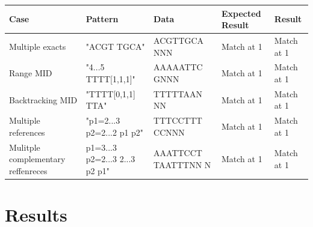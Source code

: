 \documentclass[12pt]{article}
\newcommand{\textapprox}{\raisebox{0.5ex}{\texttildelow}}
\begin{document}
 \begin{table}[h]
\begin{tabular}{p{4cm}|p{3cm}|p{2.5cm}|p{2.5cm}|p{2.5cm}}
Case 			& Pattern & Data & Expected Result & Result \\ \hline
Multiple exacts 	& "ACGT TGCA" & ACGTTGCA NNN & Match at 1 & Match at 1\\ \hline
Range MID		& "4...5 TTTT[1,1,1]" & AAAAATTC GNNN & Match at 1 & Match at 1\\ \hline
Backtracking MID & "TTTT[0,1,1] TTA" & TTTTTAAN NN & Match at 1 & Match at 1\\ \hline
Multiple references & "p1=2...3 p2=2...2 p1 p2" & TTTCCTTT CCNNN & Match at 1 & Match at 1\\ \hline
Mulitple complementary reffenreces & p1=3...3 p2=2...3 2...3 \textapprox p2 \textapprox p1" & 
AAATTCCT TAATTTNN N & Match at 1 & Match at 1

\end{tabular}
\end{table}



\section{Results}

\printbibliography
\end{document}
